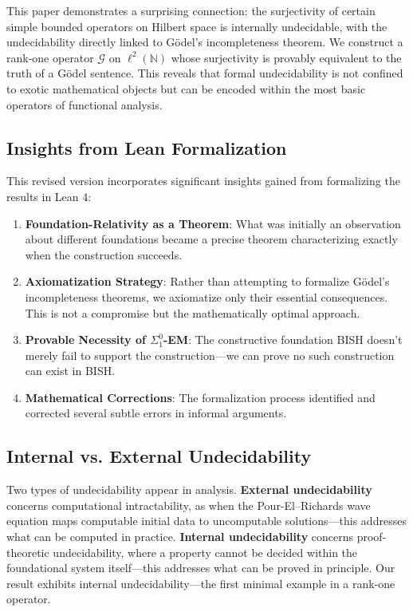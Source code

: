 \documentclass[11pt]{article}
\theoremstyle{definition}
\newcommand{\N}{\mathbb{N}}
\newcommand{\lp}{\ell^{2}(\N)}
\newcommand{\SigOne}{\Sigma^{0}_{\!1}}
\begin{document}
This paper demonstrates a surprising connection: the surjectivity of certain simple bounded operators on Hilbert space is internally undecidable, with the undecidability directly linked to Gödel's incompleteness theorem. We construct a rank-one operator $\mathcal{G}$ on $\lp$ whose surjectivity is provably equivalent to the truth of a Gödel sentence. This reveals that formal undecidability is not confined to exotic mathematical objects but can be encoded within the most basic operators of functional analysis.

\subsection{Insights from Lean Formalization}

This revised version incorporates significant insights gained from formalizing the results in Lean 4:

\begin{enumerate}
\item \textbf{Foundation-Relativity as a Theorem}: What was initially an observation about different foundations became a precise theorem characterizing exactly when the construction succeeds.

\item \textbf{Axiomatization Strategy}: Rather than attempting to formalize Gödel's incompleteness theorems, we axiomatize only their essential consequences. This is not a compromise but the mathematically optimal approach.

\item \textbf{Provable Necessity of $\SigOne$-EM}: The constructive foundation BISH doesn't merely fail to support the construction---we can prove no such construction can exist in BISH.

\item \textbf{Mathematical Corrections}: The formalization process identified and corrected several subtle errors in informal arguments.
\end{enumerate}

\subsection{Internal vs. External Undecidability}

Two types of undecidability appear in analysis. \textbf{External undecidability} concerns computational intractability, as when the Pour-El--Richards wave equation \cite{PER89} maps computable initial data to uncomputable solutions---this addresses what can be computed in practice. \textbf{Internal undecidability} concerns proof-theoretic undecidability, where a property cannot be decided within the foundational system itself---this addresses what can be proved in principle. Our result exhibits internal undecidability---the first minimal example in a rank-one operator.
\end{document}
